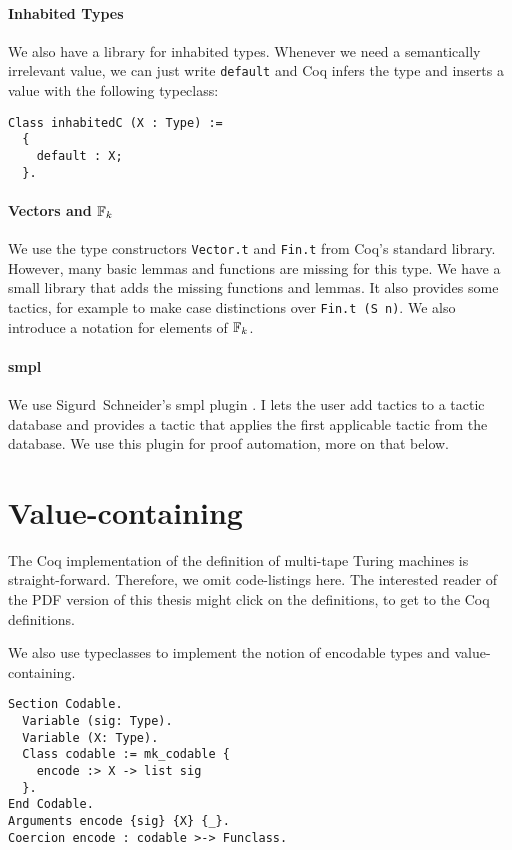 \paragraph{Inhabited Types}
We also have a library for inhabited types.  Whenever we need a semantically irrelevant value, we can just write \lstinline!default! and Coq infers
the type and inserts a value with the following typeclass:
\begin{lstlisting}
Class inhabitedC (X : Type) :=
  {
    default : X;
  }.
\end{lstlisting}

\paragraph{Vectors and $\mathbb{F}_k$}

We use the type constructors \lstinline!Vector.t! and \lstinline!Fin.t! from Coq's standard library.  However, many basic lemmas and functions are
missing for this type.  We have a small library that adds the missing functions and lemmas.  It also provides some tactics, for example to make case
distinctions over \lstinline!Fin.t (S n)!.  We also introduce a notation for elements of $\mathbb{F}_k$.

\paragraph{smpl}

We use Sigurd~Schneider's smpl plugin \cite{SMPL}.  I lets the user add tactics to a tactic database and provides a tactic that applies the first
applicable tactic from the database.  We use this plugin for proof automation, more on that below.


\section{Value-containing}
\label{sec:coq-values}

The Coq implementation of the definition of multi-tape Turing machines is straight-forward.  Therefore, we omit code-listings here.  The interested
reader of the PDF version of this thesis might click on the definitions, to get to the Coq definitions.

We also use typeclasses to implement the notion of encodable types and value-containing.

\begin{lstlisting}
Section Codable.
  Variable (sig: Type).
  Variable (X: Type).
  Class codable := mk_codable {
    encode :> X -> list sig
  }.
End Codable.
Arguments encode {sig} {X} {_}.
Coercion encode : codable >-> Funclass.
\end{lstlisting}

